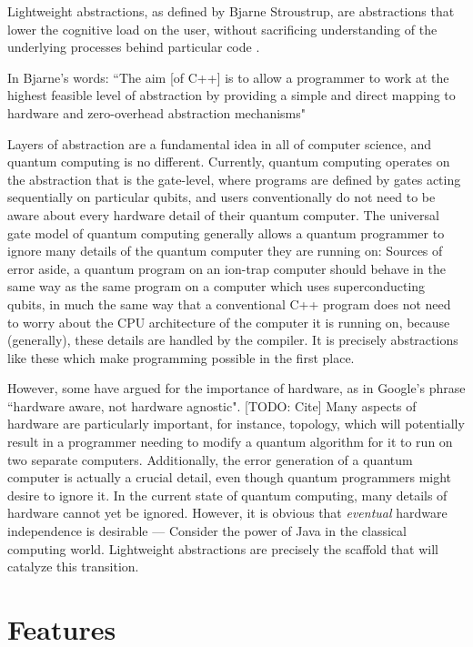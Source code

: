 \documentclass[a4paper,twocolumn,11pt,accepted=2017-05-09]{quantumarticle}
\begin{document}
Lightweight abstractions, as defined by Bjarne Stroustrup, are abstractions that lower the cognitive load on the user, without sacrificing understanding of the underlying processes behind particular code \cite{stroustrup}.

In Bjarne's words:
``The aim [of C++] is to allow a programmer to work at the highest feasible level of abstraction by providing a simple and direct mapping to hardware and zero-overhead abstraction mechanisms"

Layers of abstraction are a fundamental idea in all of computer science, and quantum computing is no different.
Currently, quantum computing operates on the abstraction that is the gate-level, where programs are defined by gates acting sequentially on particular qubits, and users conventionally do not need to be aware about every hardware detail of their quantum computer.
The universal gate model of quantum computing generally allows a quantum programmer to ignore many details of the quantum computer they are running on: Sources of error aside, a quantum program on an ion-trap computer should behave in the same way as the same program on a computer which uses superconducting qubits, in much the same way that a conventional C++ program does not need to worry about the CPU architecture of the computer it is running on, because (generally), these details are
handled by the compiler.
It is precisely abstractions like these which make programming possible in the first place.

However, some have argued for the importance of hardware, as in Google's phrase ``hardware aware, not hardware agnostic". [TODO: Cite]
Many aspects of hardware are particularly important, for instance, topology, which will potentially result in a programmer needing to modify a quantum algorithm for it to run on two separate computers.
Additionally, the error generation of a quantum computer is actually a crucial detail, even though quantum programmers might desire to ignore it.
In the current state of quantum computing, many details of hardware cannot yet be ignored. 
However, it is obvious that \emph{eventual} hardware independence is desirable --- Consider the power of Java in the classical computing world. Lightweight abstractions are precisely the scaffold that will catalyze this transition.

\section{Features}
\end{document}
